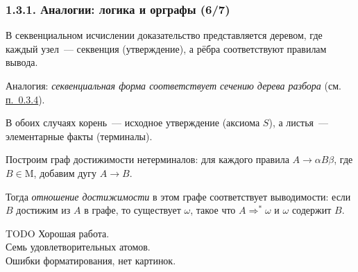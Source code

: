 \documentclass[mathserif,12pt,aspectratio=169]{beamer}
\renewcommand{\index}[1]{}
\def\odmkey#1#2{{\it\color{red} #1}\index{#2}}
\def\DMref#1#2{{\color{blue}\underline{\hyperlink{#2}{#1}}}}
\def\TODO#1{{\color{gray} TODO {#1}}}
\begin{document}
\begin{frame}
\frametitle{1.3.1. Аналогии: логика и орграфы (6/7)}

\begin{digress}
В секвенциальном исчислении доказательство 
представляется деревом, где каждый узел~--- секвенция (утверждение), 
а рёбра соответствуют правилам вывода.

Аналогия: \emph{секвенциальная форма соответствует \odmkey{сечению дерева разбора}{Сечение!дерева}} 
(см. \DMref{п.~0.3.4}{0.3.4.}).

В обоих случаях корень~--- исходное утверждение (аксиома $S$), 
а листья~--- элементарные факты (терминалы).
\end{digress}

\begin{digress}
Построим граф достижимости нетерминалов: 
для каждого правила $A \to \alpha B \beta$, где $B \in \mathrm{M}$, 
добавим дугу $A \to B$.

Тогда \emph{отношение достижимости} в этом графе соответствует выводимости:
если $B$ достижим из $A$ в графе, то существует $\omega$, такое что 
$A \Rightarrow^* \omega$ и $\omega$ содержит $B$.
\end{digress}

\bigskip
\TODO{Хорошая работа. \\
Семь удовлетворительных атомов. \\
Ошибки форматирования, нет картинок. }

\end{frame}
\end{document}
